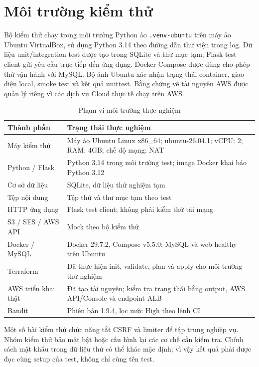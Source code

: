 \section{Môi trường kiểm thử}
Bộ kiểm thử chạy trong môi trường Python ảo \texttt{.venv-ubuntu} trên máy ảo Ubuntu VirtualBox, sử dụng Python 3.14 theo đường dẫn thư viện trong log. Dữ liệu unit/integration test được tạo trong SQLite và thư mục tạm; Flask test client gửi yêu cầu trực tiếp đến ứng dụng. Docker Compose được dùng cho phép thử vận hành với MySQL. Bộ ảnh Ubuntu xác nhận trạng thái container, giao diện local, smoke test và kết quả unittest. Bằng chứng về tài nguyên AWS được quản lý riêng vì các dịch vụ Cloud thực tế chạy trên AWS.
\begin{table}[htbp]\centering\small
\caption{Phạm vi môi trường thực nghiệm}
\begin{tabularx}{\textwidth}{P{3.6cm}X}\toprule
\textbf{Thành phần}&\textbf{Trạng thái thực nghiệm}\\\midrule
Máy kiểm thử & Máy ảo Ubuntu Linux x86\_64; ubuntu-26.04.1; vCPU: 2; RAM: 4GB; chế độ mạng: NAT\\
Python / Flask & Python 3.14 trong môi trường test; image Docker khai báo Python 3.12\\
Cơ sở dữ liệu & SQLite, dữ liệu thử nghiệm tạm\\
Tệp nội dung & Tệp thử và thư mục tạm theo test\\
HTTP ứng dụng & Flask test client; không phải kiểm thử tải mạng\\
S3 / SES / AWS API & Mock theo bộ kiểm thử\\
Docker / MySQL & Docker 29.7.2, Compose v5.5.0; MySQL và web healthy trên Ubuntu\\
Terraform & Đã thực hiện init, validate, plan và apply cho môi trường thử nghiệm\\
AWS triển khai thật & Đã tạo tài nguyên; kiểm tra trạng thái bằng output, AWS API/Console và endpoint ALB\\
Bandit & Phiên bản 1.9.4, lọc mức High theo lệnh CI\\\bottomrule
\end{tabularx}\end{table}
Một số bài kiểm thử chức năng tắt CSRF và limiter để tập trung nghiệp vụ. Nhóm kiểm thử bảo mật bật hoặc cấu hình lại các cơ chế cần kiểm tra. Chính sách mật khẩu trong dữ liệu thử có thể khác mặc định; vì vậy kết quả phải được đọc cùng setup của test, không chỉ cùng tên test.

